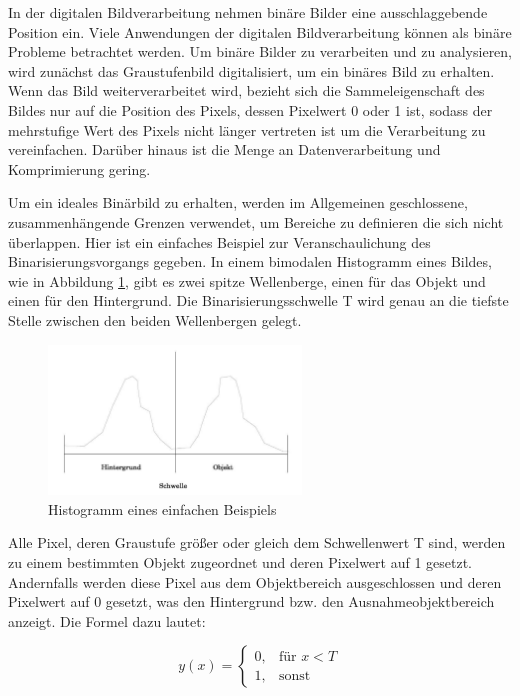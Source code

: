 In der digitalen Bildverarbeitung nehmen binäre Bilder eine ausschlaggebende Position ein. Viele Anwendungen der digitalen Bildverarbeitung können als binäre Probleme betrachtet werden. Um binäre Bilder zu verarbeiten und zu analysieren, wird zunächst das Graustufenbild digitalisiert, um ein binäres Bild zu erhalten. Wenn das Bild weiterverarbeitet wird, bezieht sich die Sammeleigenschaft des Bildes nur auf die Position des Pixels, dessen Pixelwert 0 oder 1 ist, sodass der mehrstufige Wert des Pixels nicht länger vertreten ist um die Verarbeitung zu vereinfachen. Darüber hinaus ist die Menge an Datenverarbeitung und Komprimierung gering. 

Um ein ideales Binärbild zu erhalten, werden im Allgemeinen geschlossene, zusammenhängende Grenzen verwendet, um Bereiche zu definieren die sich nicht überlappen. Hier ist ein einfaches Beispiel zur Veranschaulichung des Binarisierungsvorgangs gegeben. In einem bimodalen Histogramm eines Bildes, wie in Abbildung \ref{fig:Histogramm eines einfachen Beispiels}, gibt es zwei spitze Wellenberge, einen für das Objekt und einen für den Hintergrund. Die Binarisierungsschwelle T wird genau an die tiefste Stelle zwischen den beiden Wellenbergen gelegt. 

\begin{figure}[htb]
 \centering 
  \includegraphics[keepaspectratio,width=0.6\textwidth]{images/4_ZweiteErfahrung/Binar/binar.pdf}
 \caption{Histogramm eines einfachen Beispiels}
 \label{fig:Histogramm eines einfachen Beispiels}
\end{figure} 

Alle Pixel, deren Graustufe größer oder gleich dem Schwellenwert T sind, werden zu einem bestimmten Objekt zugeordnet und deren Pixelwert auf 1 gesetzt. Andernfalls werden diese Pixel aus dem Objektbereich ausgeschlossen und deren Pixelwert auf 0 gesetzt, was den Hintergrund bzw. den Ausnahmeobjektbereich anzeigt. Die Formel dazu lautet:

\begin{equation}
  y(x) =
  \begin{cases} 
  0,   & \mbox{für }x < T \\
  1, & \mbox{sonst}
  \end{cases}
\end{equation}

